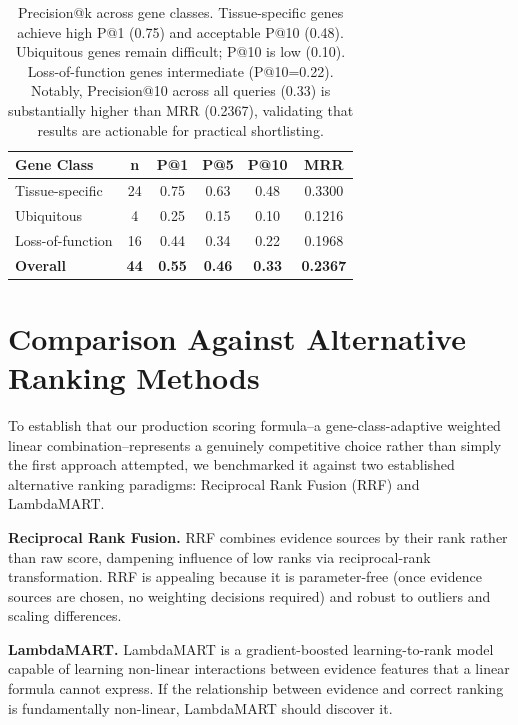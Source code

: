\documentclass[author={Karen Coutinho, Ishaan Bhalla, Aman Raj, Dixit Kaloorani Malarmannan},
                supervisor={Dr. Daniel D'Andrea},
                degree={MSc},
                title={CellSelector Omics: A Multi-Omics Recommendation System for Cell Line Selection},
                subtitle={},
                type={},
                year={2026}]{dissertation}
\begin{document}
\begin{table}[t]
\centering
\begin{tabular}{|l|c|c|c|c|c|}
\hline
{\bf Gene Class} & {\bf n} & {\bf P@1} & {\bf P@5} & {\bf P@10} & {\bf MRR} \\
\hline
Tissue-specific & 24 & 0.75 & 0.63 & 0.48 & 0.3300 \\
Ubiquitous & 4 & 0.25 & 0.15 & 0.10 & 0.1216 \\
Loss-of-function & 16 & 0.44 & 0.34 & 0.22 & 0.1968 \\
\hline
{\bf Overall} & {\bf 44} & {\bf 0.55} & {\bf 0.46} & {\bf 0.33} & {\bf 0.2367} \\
\hline
\end{tabular}
\caption{Precision@k across gene classes. Tissue-specific genes achieve high P@1 (0.75) 
and acceptable P@10 (0.48). Ubiquitous genes remain difficult; P@10 is low (0.10). 
Loss-of-function genes intermediate (P@10=0.22). Notably, Precision@10 across all 
queries (0.33) is substantially higher than MRR (0.2367), validating that results are 
actionable for practical shortlisting.}
\label{tab:precision-at-k}
\end{table}



\section{Comparison Against Alternative Ranking Methods}

To establish that our production scoring formula--a gene-class-adaptive weighted linear combination--represents a genuinely competitive choice rather than simply the first approach attempted, we benchmarked it against two established alternative ranking paradigms: Reciprocal Rank Fusion (RRF) and LambdaMART.

{\bf Reciprocal Rank Fusion.} RRF \cite{cormack2009rrf} combines evidence sources by their rank rather than raw score, dampening influence of low ranks via reciprocal-rank transformation. RRF is appealing because it is parameter-free (once evidence sources are chosen, no weighting decisions required) and robust to outliers and scaling differences.

{\bf LambdaMART.} LambdaMART \cite{burges2010} is a gradient-boosted learning-to-rank model capable of learning non-linear interactions between evidence features that a linear formula cannot express. If the relationship between evidence and correct ranking is fundamentally non-linear, LambdaMART should discover it.
\end{document}
